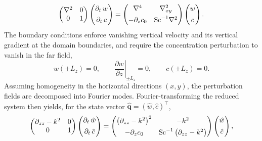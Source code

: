 \begin{equation}
    \label{eq:bq_lin_continuous}
    \begin{pmatrix}
        \nabla^{2} & 0 \\
        0 & 1
    \end{pmatrix}
    \begin{pmatrix}
        \partial_t\, w \\[4pt]
        \partial_t\, c
    \end{pmatrix}
    =
    \begin{pmatrix}
        \nabla^{4} & \nabla_{xy}^{2} \\[4pt]
        -\partial_{z}c_{0} & \mathrm{Sc}^{-1}\nabla^{2}
    \end{pmatrix}
    \begin{pmatrix}
        w \\[4pt]
        c
    \end{pmatrix}.
\end{equation}
The boundary conditions enforce vanishing vertical velocity and its vertical gradient at the
domain boundaries, and require the concentration perturbation to vanish in the far field,
\begin{equation}
    \label{eq:bq_boundary_conditions}
    w(\pm L_z) = 0, \qquad \left.\frac{\partial w}{\partial z}\right|_{\pm L_z} = 0, \qquad
    c(\pm L_z) = 0.
\end{equation}
Assuming homogeneity in the horizontal directions \((x,y)\), the perturbation fields are decomposed into Fourier modes. Fourier-transforming the reduced system then yields, for the
state vector \(\hat{\boldsymbol{q}}=(\hat{w},\hat{c})^{\top}\),
\begin{equation}
    \label{eq:lti_dz_k_boussinesq}
    \begin{pmatrix}
        \partial_{zz}-k^{2} & 0 \\
        0 & 1
    \end{pmatrix}
    \begin{pmatrix}
        \partial_t\, \hat{w} \\[4pt]
        \partial_t\, \hat{c}
    \end{pmatrix}
    =
    \begin{pmatrix}
        \left(\partial_{zz}-k^{2}\right)^{2} & -k^{2} \\[4pt]
        -\partial_{z}c_{0} & \mathrm{Sc}^{-1}\left(\partial_{zz}-k^{2}\right)
    \end{pmatrix}
    \begin{pmatrix}
        \hat{w} \\[4pt]
        \hat{c}
    \end{pmatrix},
\end{equation}
